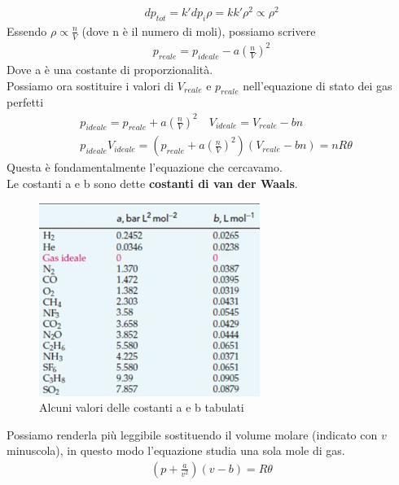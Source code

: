 \documentclass[10pt,a4paper]{article}
\begin{document}
\begin{align*} 
	dp_{tot} = k'dp_i\rho  = kk' \rho^2 \propto \rho^2
\end{align*} 
Essendo $\rho \propto \frac{n}{V}$ (dove n è il numero di moli), possiamo scrivere
\begin{align*} 
p_{reale} = p_{ideale}- a  \left(\frac{n}{V}\right)^2
\end{align*} 
Dove a è una costante di proporzionalità.\\
Possiamo ora sostituire i valori di $V_{reale}$ e $p_{reale}$ nell'equazione di stato dei gas perfetti
\begin{align*} 
	& p_{ideale} = p_{reale} + a \left(\frac{n}{V}\right)^2 \quad V_{ideale} = V_{reale} - b n\\
	& p_{ideale} V_{ideale} = \left(p_{reale} + a \left(\frac{n}{V}\right)^2 \right) \left( V_{reale} - b n \right) = n R \theta 
\end{align*} 
Questa è fondamentalmente l'equazione che cercavamo.\\
Le costanti a e b sono dette \textbf{costanti di van der Waals}.
\begin{figure}[h!]
	\centering
	\includegraphics[width=0.5\linewidth]{../images/costantiaeb}
	\caption{Alcuni valori delle costanti a e b tabulati}
	\label{fig:costantiaeb}
\end{figure}
\FloatBarrier
Possiamo renderla più leggibile sostituendo il volume molare (indicato con $v$ minuscola), in questo modo l'equazione studia una sola mole di gas.  
\begin{align*} 
\left( p + \frac{a}{v^2}\right)\left(v-b\right) = R \theta
\end{align*} 
\end{document}
